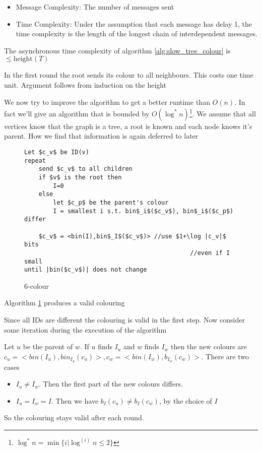 \begin{itemize}
\item Message Complexity: The number of messages sent
\item Time Complexity: Under the assumption that each message has delay 1, the time complexity is the length of the longest chain of interdependent messages.
\end{itemize}

\begin{thm} The asynchronous time complexity of algorithm \ref{alg:slow_tree_colour} is $\leq \text{height}(T)$ \end{thm}
\begin{pr} In the first round the root sends its colour to all neighbours. This costs one time unit. Argument follows from induction on the height\end{pr}

We now try to improve the algorithm to get a better runtime than $O(n)$. In fact we'll give an algorithm that is bounded by $O(\log^*n)$\footnote{$\log^* n = \min \{i|\log^{(i)} n \leq 2\}$}. We assume that all vertices know that the graph is a tree, a root is known and each node knows it's parent. How we find that information is again deferred to later

\begin{figure}[hbt]
\begin{lstlisting}
Let $c_v$ be ID(v)
repeat 
	send $c_v$ to all children
	if $v$ is the root then
		I=0
	else 
		let $c_p$ be the parent's colour
		I = smallest i s.t. bin$_i$($c_v$), bin$_i$($c_p$) differ
		
	$c_v$ = <bin(I),bin$_I$($c_v$)> //use $1+\log |c_v|$ bits  
											  //even if I small
until |bin($c_v$)| does not change
\end{lstlisting}
\caption{6-colour}
\label{alg:6-colour}
\end{figure}

\begin{lem} Algorithm \ref{alg:6-colour} produces a valid colouring \end{lem}

\begin{pr} Since all IDs are different the colouring is valid in the first step. Now consider some iteration during the execution of the algorithm

Let $u$ be the parent of $w$. If $u$ finds $I_u$ and $w$ finds $I_w$ then the new colours are $c_u=<bin(I_u), bin_{I_u}(c_u)>, c_w=<bin(I_w),b_{I_w}(c_w)>$. There are two cases

\begin{itemize}
\item $I_u\neq I_w$. Then the first part of the new colours differs. \ok
\item $I_u=I_w=I$. Then we have $b_I(c_u)\neq b_I(c_w)$, by the choice of $I$ \ok
\end{itemize}

So the colouring stays valid after each round.
\end{pr}

